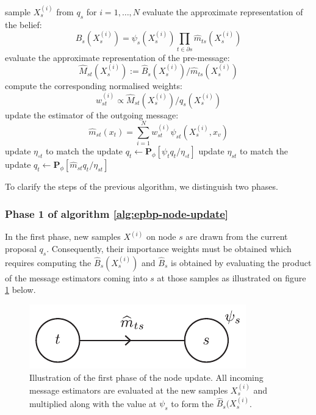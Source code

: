 \begin{algorithm}[!h]\small
	\caption{\label{alg:epbp-node-update}}
	\begin{spacing}{1.2}
	\begin{algorithmic}[1]
		\State sample $X^{(i)}_{s}$ from $q_{s}$ for $i=1,\dots,N$
		\State evaluate the approximate representation of the belief: $$\widehat B_{s}(X_{s}^{(i)}) = \psi_{s}(X_{s}^{(i)})\prod_{t\in\partial {s}}\widehat m_{ts}(X_{s}^{(i)})$$%
			\State evaluate the approximate representation of the pre-message: $$\widehat M_{st}(X_{s}^{(i)}) :=\widehat B_{s}(X_{s}^{(i)})/\widehat m_{ts}(X_{s}^{(i)})$$
			\State compute the corresponding normalised weights: $$ w_{st}^{(i)}\propto \widehat M_{st}(X_{s}^{(i)})/q_{s}(X_{s}^{(i)})$$
			\State update the estimator of the outgoing message: $$\widehat m_{st}(x_{t})=\sum_{i=1}^{N}w^{(i)}_{st}\psi_{st}(X_{s}^{(i)},x_{v})$$
			\State update $\eta_{\circ t}$ to match the update $q_{t} \leftarrow \mathbf P_{\phi}[\psi_{t}q_{t}/\eta_{\circ t}]$ 
			\State update $\eta_{st}$ to match the update $q_{t}\leftarrow \mathbf P_{\phi}[\widehat m_{st}q_{t}/\eta_{st}]$%
		\EndFor
	\end{algorithmic}
	\end{spacing}
\end{algorithm}

To clarify the steps of the previous algorithm, we distinguish two phases.
\subsubsection{Phase 1 of algorithm \ref{alg:epbp-node-update}}
In the first phase, new samples $X^{(i)}$ on node $s$ are drawn from the current proposal $q_{s}$. 
Consequently, their importance weights must be obtained which requires computing the $\widehat B_{s}(X^{(i)}_{s})$ and $\widehat B_{s}$ is obtained by evaluating the product of the message estimators coming into $s$ at those samples as illustrated on figure \ref{fig:epbp-ill-1} below.
\clearpage
%
\begin{figure}[!h]
\center
\includegraphics[width=.4\textwidth]{./figures/extra/epbp-ill-1}
\caption{\label{fig:epbp-ill-1} Illustration of the first phase of the node update. All incoming message estimators are evaluated at the new samples $X^{(i)}_{s}$ and multiplied along with the value at $\psi_{s}$ to form the $\widehat B_{s}(X^{(i)}_{s}$.}
\end{figure}
%

